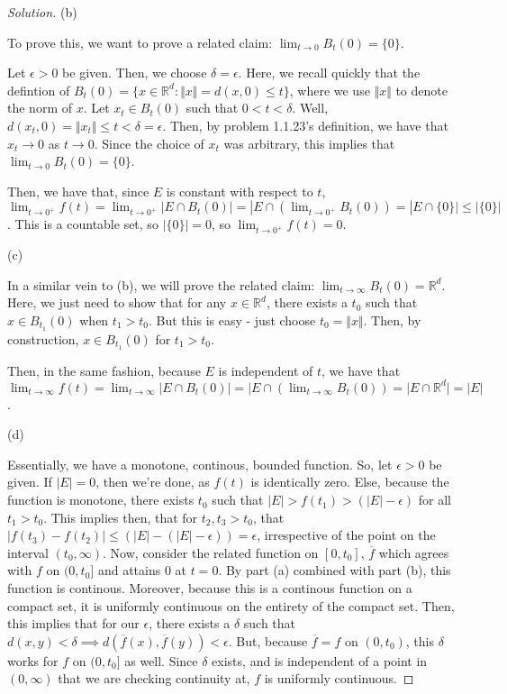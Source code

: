 \documentclass[10pt]{article}
\begin{document}
\begin{proof}[Solution]
(b)

To prove this, we want to prove a related claim: $\lim_{t \to 0} B_t(0) = \{0\}$.

Let $\epsilon > 0$ be given. Then, we choose $\delta =  \epsilon$. Here, we recall quickly that the defintion of $B_t(0) = \{ x \in \mathbb{R}^d : \Vert x \Vert = d(x,0) \leq t \}$, where we use $\Vert x \Vert$ to denote the norm of $x$. Let $x_t \in B_t(0)$ such that $0 < t < \delta$. Well, $d(x_t,0)  = \Vert x_t \Vert \leq t < \delta = \epsilon$. Then, by problem 1.1.23's definition, we have that $x_t \to 0$ as $t \to 0$. Since the choice of $x_t$ was arbitrary, this implies that $\lim_{t \to 0} B_t(0) = \{0\}$.

Then, we have that, since $E$ is constant with respect to $t$,  $\lim_{t \rightarrow 0^+} f(t) = \lim_{t \rightarrow 0^+} |E \cap B_t(0)| = | E \cap ( \lim_{t \rightarrow 0^+} B_t(0))  = |E \cap \{0\} | \leq |\{0\}|$. This is a countable set, so $|\{ 0 \}| = 0$, so $\lim_{t \rightarrow 0^+} f(t) = 0$.

(c)

In a similar vein to (b), we will prove the related claim: $\lim_{t \to \infty} B_t(0) = \mathbb{R}^d$. Here, we just need to show that for any $x \in \mathbb{R}^d$, there exists a $t_0$ such that $x \in B_{t_1}(0)$ when $t_1 > t_0$. But this is easy - just choose $t_0 =  \Vert x \Vert$. Then, by construction, $x \in B_{t_1}(0)$ for $t_1 > t_0$.

Then, in the same fashion, because $E$ is independent of $t$, we have that $\lim_{t \rightarrow \infty} f(t) = \lim_{t \rightarrow \infty} |E \cap B_t(0)| = | E \cap ( \lim_{t \rightarrow \infty} B_t(0))  = |E \cap \mathbb{R}^d | = |E|$.

(d)

Essentially, we have a monotone, continous, bounded function. So, let $\epsilon > 0$ be given. If $|E| = 0$, then we're done, as $f(t)$ is identically zero. Else, because the function is monotone, there exists $t_0$ such that $|E| > f(t_1) > (|E| - \epsilon)$ for all $t_1 > t_0$. This implies then, that for $t_2,t_3 > t_0$, that $|f(t_3) - f(t_2)| \leq (|E| - (|E| - \epsilon)) = \epsilon$, irrespective of the point on the interval $(t_0, \infty)$. Now, consider the related function on $[0,t_0]$, $\overline{f}$ which agrees with $f$ on $(0,t_0]$ and attains $0$ at $ t = 0$. By part (a) combined with part (b), this function is continous. Moreover, because this is a continous function on a compact set, it is uniformly continuous on the entirety of the compact set. Then, this implies that for our $\epsilon$, there exists a $\delta$ such that $d(x,y) < \delta \implies d(\overline{f}(x),\overline{f}(y)) < \epsilon$. But, because $\overline{f} = f$ on $(0,t_0)$, this $\delta$ works for $f$ on $(0,t_0]$ as well. Since $\delta$ exists, and is independent of a point in $(0,\infty)$ that we are checking continuity at, $f$ is uniformly continuous.
\end{proof}
\end{document}
